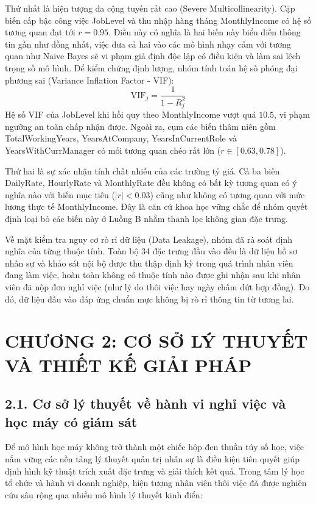 \documentclass[12pt,a4paper]{article}
\begin{document}
Thứ nhất là hiện tượng đa cộng tuyến rất cao (Severe Multicollinearity). Cặp biến cấp bậc công việc JobLevel và thu nhập hàng tháng MonthlyIncome có hệ số tương quan đạt tới $r = 0.95$. Điều này có nghĩa là hai biến này biểu diễn thông tin gần như đồng nhất, việc đưa cả hai vào các mô hình nhạy cảm với tương quan như Naive Bayes sẽ vi phạm giả định độc lập có điều kiện và làm sai lệch trọng số mô hình. Để kiểm chứng định lượng, nhóm tính toán hệ số phóng đại phương sai (Variance Inflation Factor - VIF):
\begin{equation}
\text{VIF}_j = \frac{1}{1 - R_j^2}
\end{equation}
Hệ số VIF của JobLevel khi hồi quy theo MonthlyIncome vượt quá $10.5$, vi phạm ngưỡng an toàn chấp nhận được. Ngoài ra, cụm các biến thâm niên gồm TotalWorkingYears, YearsAtCompany, YearsInCurrentRole và YearsWithCurrManager có mối tương quan chéo rất lớn ($r \in [0.63, 0.78]$).

Thứ hai là sự xác nhận tính chất nhiễu của các trường tỷ giá. Cả ba biến DailyRate, HourlyRate và MonthlyRate đều không có bất kỳ tương quan có ý nghĩa nào với biến mục tiêu ($|r| < 0.03$) cũng như không có tương quan với mức lương thực tế MonthlyIncome. Đây là căn cứ khoa học vững chắc để nhóm quyết định loại bỏ các biến này ở Luồng B nhằm thanh lọc không gian đặc trưng.

Về mặt kiểm tra nguy cơ rò rỉ dữ liệu (Data Leakage), nhóm đã rà soát định nghĩa của từng thuộc tính. Toàn bộ 34 đặc trưng đầu vào đều là dữ liệu hồ sơ nhân sự và khảo sát nội bộ được thu thập định kỳ trong quá trình nhân viên đang làm việc, hoàn toàn không có thuộc tính nào được ghi nhận sau khi nhân viên đã nộp đơn nghỉ việc (như lý do thôi việc hay ngày chấm dứt hợp đồng). Do đó, dữ liệu đầu vào đáp ứng chuẩn mực không bị rò rỉ thông tin từ tương lai.


\newpage
\section{CHƯƠNG 2: CƠ SỞ LÝ THUYẾT VÀ THIẾT KẾ GIẢI PHÁP}

\subsection{2.1. Cơ sở lý thuyết về hành vi nghỉ việc và học máy có giám sát}
Để mô hình học máy không trở thành một chiếc hộp đen thuần túy số học, việc nắm vững các nền tảng lý thuyết quản trị nhân sự là điều kiện tiên quyết giúp định hình kỹ thuật trích xuất đặc trưng và giải thích kết quả. Trong tâm lý học tổ chức và hành vi doanh nghiệp, hiện tượng nhân viên thôi việc đã được nghiên cứu sâu rộng qua nhiều mô hình lý thuyết kinh điển:
\end{document}
